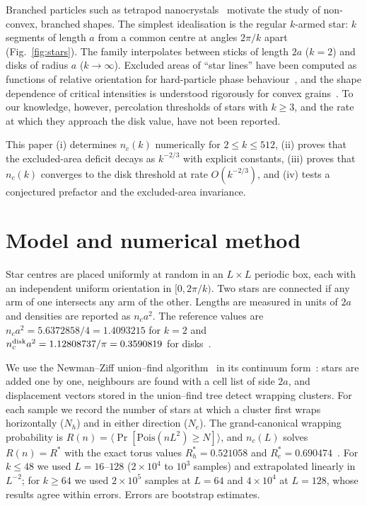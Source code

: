 \documentclass[pre,twocolumn,superscriptaddress,nofootinbib]{revtex4-2}
\newcommand{\nd}{n_c^{\rm disk}}
\begin{document}
Branched particles such as tetrapod nanocrystals~\cite{Manna2003} motivate the study of non-convex, branched shapes.
The simplest idealisation is the regular $k$-armed star: $k$ segments of length $a$ from a common centre at angles $2\pi/k$ apart (Fig.~\ref{fig:stars}).
The family interpolates between sticks of length $2a$ ($k=2$) and disks of radius $a$ ($k\to\infty$).
Excluded areas of ``star lines'' have been computed as functions of relative orientation for hard-particle phase behaviour~\cite{Geigenfeind2019}, and the shape dependence of critical intensities is understood rigorously for convex grains~\cite{RoyTanemura2002}.
To our knowledge, however, percolation thresholds of stars with $k\ge3$, and the rate at which they approach the disk value, have not been reported.

This paper (i) determines $n_c(k)$ numerically for $2\le k\le512$, (ii) proves that the excluded-area deficit decays as $k^{-2/3}$ with explicit constants, (iii) proves that $n_c(k)$ converges to the disk threshold at rate $O(k^{-2/3})$, and (iv) tests a conjectured prefactor and the excluded-area invariance.


\section{Model and numerical method}
Star centres are placed uniformly at random in an $L\times L$ periodic box, each with an independent uniform orientation in $[0,2\pi/k)$.
Two stars are connected if any arm of one intersects any arm of the other.
Lengths are measured in units of $2a$ and densities are reported as $n_ca^2$.
The reference values are $n_ca^2=5.6372858/4=1.4093215$ for $k=2$ and $\nd a^2=1.12808737/\pi=0.3590819$ for disks~\cite{Mertens2012}.

We use the Newman--Ziff union--find algorithm~\cite{NewmanZiff2001} in its continuum form~\cite{Mertens2012}: stars are added one by one, neighbours are found with a cell list of side $2a$, and displacement vectors stored in the union--find tree detect wrapping clusters.
For each sample we record the number of stars at which a cluster first wraps horizontally ($N_h$) and in either direction ($N_e$).
The grand-canonical wrapping probability is $R(n)=\langle \Pr[\mathrm{Pois}(nL^2)\ge N]\rangle$, and $n_c(L)$ solves $R(n)=R^*$ with the exact torus values $R_h^*=0.521058$ and $R_e^*=0.690474$~\cite{Pinson1994}.
For $k\le 48$ we used $L=16$--$128$ ($2\times10^4$ to $10^3$ samples) and extrapolated linearly in $L^{-2}$; for $k\ge64$ we used $2\times10^5$ samples at $L=64$ and $4\times10^4$ at $L=128$, whose results agree within errors.
Errors are bootstrap estimates.
\end{document}

